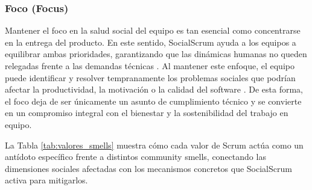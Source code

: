 \subsubsection{Foco (Focus)}
Mantener el foco en la salud social del equipo es tan esencial como concentrarse en la entrega del producto.
En este sentido, SocialScrum ayuda a los equipos a equilibrar ambas prioridades, garantizando que las dinámicas humanas no queden relegadas frente a las demandas técnicas \cite{saeeda2024nontechnicaldebt}.
Al mantener este enfoque, el equipo puede identificar y resolver tempranamente los problemas sociales que podrían afectar la productividad, la motivación o la calidad del software \cite{saeeda2024nontechnicaldebt}.
De esta forma, el foco deja de ser únicamente un asunto de cumplimiento técnico y se convierte en un compromiso integral con el bienestar y la sostenibilidad del trabajo en equipo.

La Tabla \ref{tab:valores_smells} muestra cómo cada valor de Scrum actúa como un antídoto específico frente a distintos community smells, conectando las dimensiones sociales afectadas con los mecanismos concretos que SocialScrum activa para mitigarlos.

